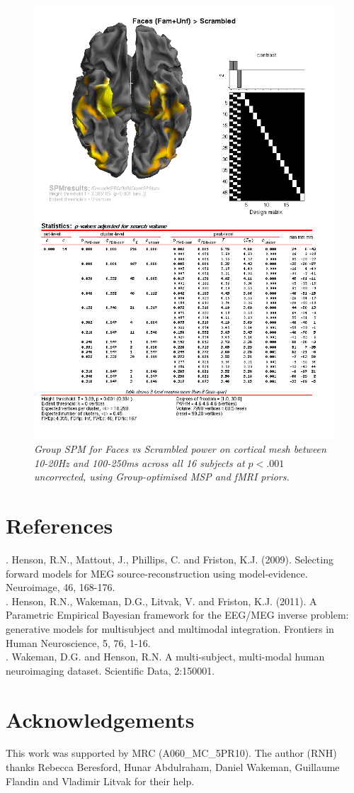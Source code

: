 \begin{figure}
\begin{center}
\includegraphics[width=150mm]{multi/figures/figure16}
\caption{\em Group SPM for Faces vs Scrambled power on cortical mesh between 10-20Hz and 100-250ms  across all 16 subjects at \(p<.001\) uncorrected, using Group-optimised MSP and fMRI priors. \label{multi:fig:16}}
\end{center}
\end{figure}

\section{References}

. Henson, R.N., Mattout, J., Phillips, C. and Friston, K.J. (2009). Selecting forward models for MEG source-reconstruction using model-evidence. Neuroimage, 46, 168-176. \\
. Henson, R.N., Wakeman, D.G., Litvak, V. and Friston, K.J. (2011). A Parametric Empirical Bayesian framework for the EEG/MEG inverse problem: generative models for multisubject and multimodal integration. Frontiers in Human Neuroscience, 5, 76, 1-16. \\
. Wakeman, D.G. and Henson, R.N. A multi-subject, multi-modal human neuroimaging dataset. Scientific Data, 2:150001. \\

\section{Acknowledgements}
This work was supported by MRC (A060\_MC\_5PR10). The author (RNH) thanks Rebecca Beresford, Hunar Abdulraham, Daniel Wakeman, Guillaume Flandin and Vladimir Litvak for their help.
